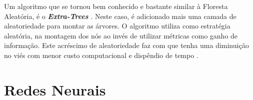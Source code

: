 \documentclass[
]{book}
\begin{document}
Um algoritmo que se tornou bem conhecido e bastante similar à Floresta Aleatória, é o \textbf{\emph{Extra-Trees}} \citep{geurts2006extremely}. Neste caso, é adicionado mais uma camada de aleatoriedade para montar as árvores. O algoritmo utiliza como estratégia aleatória, na montagem dos nós ao invés de utilizar métricas como ganho de informação. Este acréscimo de aleatoriedade faz com que tenha uma diminuição no viés com menor custo computacional e dispêndio de tempo \citep{machado2020avaliaccao}.

\hypertarget{redesneurais}{%
\chapter{Redes Neurais}\label{redesneurais}}

  
\end{document}
